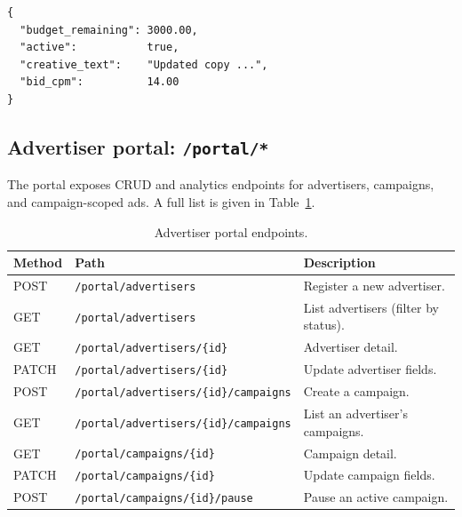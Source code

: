 \begin{appendices}
\begin{lstlisting}[style=jsonstyle, caption={\texttt{AdUpdatePayload} schema (all fields optional).}]
{
  "budget_remaining": 3000.00,
  "active":           true,
  "creative_text":    "Updated copy ...",
  "bid_cpm":          14.00
}
\end{lstlisting}

\subsection*{Advertiser portal: \texttt{/portal/*}}

The portal exposes CRUD and analytics endpoints for advertisers,
campaigns, and campaign-scoped ads. A full list is given in
Table~\ref{tab:portal-endpoints}.

\begin{table}[H]
    \centering
    \caption{Advertiser portal endpoints.}
    \label{tab:portal-endpoints}
    \footnotesize
    \begin{tabular}{@{}llp{7cm}@{}}
        \toprule
        \textbf{Method} & \textbf{Path} & \textbf{Description} \\ \midrule
        POST    & \texttt{/portal/advertisers}                            & Register a new advertiser.           \\
        GET     & \texttt{/portal/advertisers}                            & List advertisers (filter by status). \\
        GET     & \texttt{/portal/advertisers/\{id\}}                     & Advertiser detail.                   \\
        PATCH   & \texttt{/portal/advertisers/\{id\}}                     & Update advertiser fields.            \\
        POST    & \texttt{/portal/advertisers/\{id\}/campaigns}           & Create a campaign.                   \\
        GET     & \texttt{/portal/advertisers/\{id\}/campaigns}           & List an advertiser's campaigns.      \\
        GET     & \texttt{/portal/campaigns/\{id\}}                       & Campaign detail.                     \\
        PATCH   & \texttt{/portal/campaigns/\{id\}}                       & Update campaign fields.              \\
        POST    & \texttt{/portal/campaigns/\{id\}/pause}                 & Pause an active campaign.            \\

\end{tabular}
\end{table}
\end{appendices}
